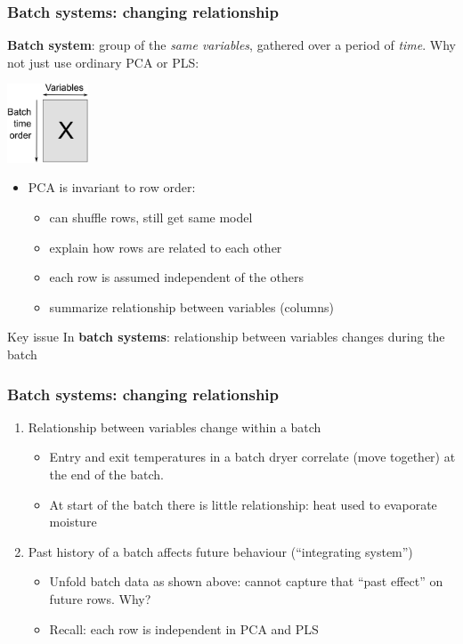 \documentclass[handout, 12pt]{beamer}
\begin{document}
\begin{frame}\frametitle{Batch systems: changing relationship}

	\textbf{Batch system}: group of the \emph{same variables}, gathered over a period of \emph{time}.  Why not just use ordinary PCA or PLS:

	\begin{center}
		\includegraphics[width=2.4cm]{images/batch-illustrate-unusual-unfolding.png}
	\end{center}


	\begin{itemize}
		\item 	PCA is invariant to row order: 
		\begin{itemize}			
			\item	can shuffle rows, still get same model
			\item 	explain how rows are related to each other
			\item 	each row is assumed independent of the others
			\item 	summarize relationship between variables (columns)
		\end{itemize}
	\end{itemize}

	\begin{exampleblock}{Key issue}
	In \textbf{batch systems}: relationship between variables \alert{changes during the batch}
	\end{exampleblock}
\end{frame}

\begin{frame}\frametitle{Batch systems: changing relationship}

\begin{enumerate}
	\item Relationship between variables change within a batch 
			\begin{itemize}
				\item 	Entry and exit temperatures in a batch dryer correlate (move together) at the end of the batch. 
				\item 	At start of the batch there is little relationship: heat used to evaporate moisture	
			\end{itemize}\pause

	
	\item Past history of a batch affects future behaviour (``integrating system'')
	
			\begin{itemize}
				\item 	Unfold batch data as shown above: cannot capture that ``past effect'' on future rows.  Why?
				\item  	Recall: each row is independent in PCA and PLS
			\end{itemize}

\end{enumerate}
\end{frame}
\end{document}
